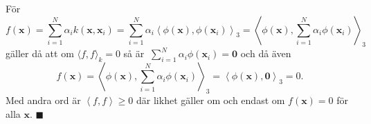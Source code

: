 \documentclass[a4paper, 12pt]{report}
\theoremstyle{definition}
\theoremstyle{remark}
\renewcommand\qedsymbol{$\blacksquare$}
\newcommand{\bfx}{\mathbf{x}}
\begin{document}
\begin{enumerate}
	För
	\begin{equation*}
		f\left(\bfx\right)=\sum_{i=1}^{N}\alpha_i k\left(\bfx, \bfx_i\right) = \sum_{i=1}^{N}\alpha_i \left\langle\phi\left(\bfx\right), \phi\left(\bfx_i\right) \right\rangle_3 = \left\langle \phi\left(\bfx\right), \sum_{i=1}^{N}\alpha_i\phi\left(\bfx_i\right) \right\rangle_3
	\end{equation*}
	gäller då att om $\langle f, f \rangle_k = 0$ så är $\ \sum_{i=1}^{N}\alpha_i\phi\left(\bfx_i\right)=\mathbf{0}$ och då även
	\begin{equation*}
		f\left(\bfx\right) = \left\langle \phi\left(\bfx\right), \sum_{i=1}^{N}\alpha_i\phi\left(\bfx_i\right) \right\rangle_3 = \left\langle \phi\left(\bfx\right), \mathbf{0}\right\rangle_3=0.
	\end{equation*}
	Med andra ord är $\left\langle f,f\right\rangle\geq0$ där likhet gäller om och endast om $f\left(\bfx\right)=0$ för alla $\bfx$.
	\qquad \hfill \qedsymbol
	

\end{enumerate}
\end{document}
